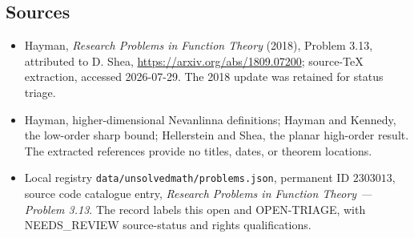 \documentclass[11pt]{article}
\begin{document}
\subsection{Sources}
\begin{itemize}
\item Hayman, \emph{Research Problems in Function Theory} (2018), Problem 3.13, attributed to D. Shea, \url{https://arxiv.org/abs/1809.07200}; source-TeX extraction, accessed 2026-07-29. The 2018 update was retained for status triage.
\item Hayman, higher-dimensional Nevanlinna definitions; Hayman and Kennedy, the low-order sharp bound; Hellerstein and Shea, the planar high-order result. The extracted references provide no titles, dates, or theorem locations.
\item Local registry \texttt{data/unsolvedmath/problems.json}, permanent ID $2303013$, source code catalogue entry, \emph{Research Problems in Function Theory --- Problem 3.13}. The record labels this open and OPEN-TRIAGE, with NEEDS\_REVIEW source-status and rights qualifications.
\end{itemize}
\end{document}

